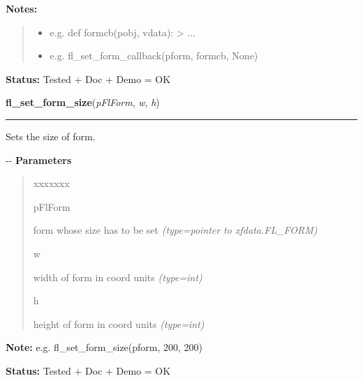 \begin{boxedminipage}{\funcwidth}
\textbf{Notes:}
\begin{quote}
  \begin{itemize}

  \item
    \setlength{\parskip}{0.6ex}

e.g. def formcb(pobj, vdata): > ...


  \item 
e.g. fl\_set\_form\_callback(pform, formcb, None)


\end{itemize}

\end{quote}

\textbf{Status:} 
Tested + Doc + Demo = OK


    \end{boxedminipage}

    \label{xformslib:flbasic:fl_set_form_size}

    \vspace{0.5ex}

\hspace{.8\funcindent}\begin{boxedminipage}{\funcwidth}

    \raggedright \textbf{fl\_set\_form\_size}(\textit{pFlForm}, \textit{w}, \textit{h})

    \vspace{-1.5ex}

    \rule{\textwidth}{0.5\fboxrule}
\setlength{\parskip}{2ex}

Sets the size of form.

-{}-
\setlength{\parskip}{1ex}
      \textbf{Parameters}
      \vspace{-1ex}

      \begin{quote}
        \begin{Ventry}{xxxxxxx}

          \item[pFlForm]


form whose size has to be set
            {\it (type=pointer to xfdata.FL\_FORM)}

          \item[w]


width of form in coord units
            {\it (type=int)}

          \item[h]


height of form in coord units
            {\it (type=int)}

        \end{Ventry}

      \end{quote}

\textbf{Note:} 
e.g. fl\_set\_form\_size(pform, 200, 200)


\textbf{Status:} 
Tested + Doc + Demo = OK


    \end{boxedminipage}

